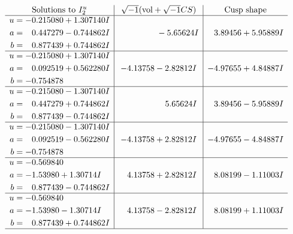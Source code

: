 \documentclass[1p]{elsarticle_modified}
\theoremstyle{definition}
\newcommand{\I}{\sqrt{-1}}
\begin{document}
$$\begin{array}{c|c|c}  
\text{Solutions to }I^u_{2}& \I (\text{vol} + \sqrt{-1}CS) & \text{Cusp shape}\\
 \hline 
\begin{aligned}
u &= -0.215080 + 1.307140 I \\
a &= \phantom{-}0.447279 - 0.744862 I \\
b &= \phantom{-}0.877439 + 0.744862 I\end{aligned}
 & \phantom{-0.000000 } -5.65624 I & \phantom{-}3.89456 + 5.95889 I \\ \hline\begin{aligned}
u &= -0.215080 + 1.307140 I \\
a &= \phantom{-}0.092519 + 0.562280 I \\
b &= -0.754878\phantom{ +0.000000I}\end{aligned}
 & -4.13758 - 2.82812 I & -4.97655 + 4.84887 I \\ \hline\begin{aligned}
u &= -0.215080 - 1.307140 I \\
a &= \phantom{-}0.447279 + 0.744862 I \\
b &= \phantom{-}0.877439 - 0.744862 I\end{aligned}
 & \phantom{-0.000000 -}5.65624 I & \phantom{-}3.89456 - 5.95889 I \\ \hline\begin{aligned}
u &= -0.215080 - 1.307140 I \\
a &= \phantom{-}0.092519 - 0.562280 I \\
b &= -0.754878\phantom{ +0.000000I}\end{aligned}
 & -4.13758 + 2.82812 I & -4.97655 - 4.84887 I \\ \hline\begin{aligned}
u &= -0.569840\phantom{ +0.000000I} \\
a &= -1.53980 + 1.30714 I \\
b &= \phantom{-}0.877439 - 0.744862 I\end{aligned}
 & \phantom{-}4.13758 + 2.82812 I & \phantom{-}8.08199 - 1.11003 I \\ \hline\begin{aligned}
u &= -0.569840\phantom{ +0.000000I} \\
a &= -1.53980 - 1.30714 I \\
b &= \phantom{-}0.877439 + 0.744862 I\end{aligned}
 & \phantom{-}4.13758 - 2.82812 I & \phantom{-}8.08199 + 1.11003 I\\
 \hline 
 \end{array}$$\newpage\newpage\renewcommand{\arraystretch}{1}
\end{document}
